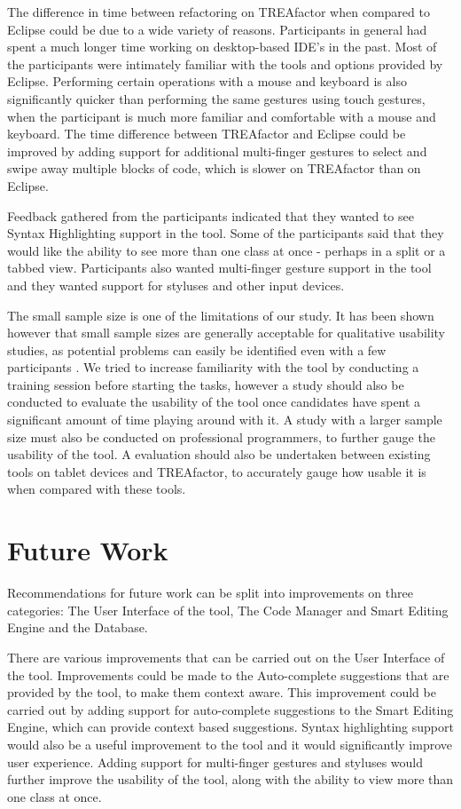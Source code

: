 \documentclass[10.5pt,twocolumn]{article}
\begin{document}
The difference in time between refactoring on TREAfactor when compared to Eclipse could be due to a wide variety of reasons. Participants in general had spent a much longer time working on desktop-based IDE’s in the past. Most of the participants were intimately familiar with the tools and options provided by Eclipse. Performing certain operations with a mouse and keyboard is also significantly quicker than performing the same gestures using touch gestures, when the participant is much more familiar and comfortable with a mouse and keyboard. The time difference between TREAfactor and Eclipse could be improved by adding support for additional multi-finger gestures to select and swipe away multiple blocks of code, which is slower on TREAfactor than on Eclipse.

Feedback gathered from the participants indicated that they wanted to see Syntax Highlighting support in the tool. Some of the participants said that they would like the ability to see more than one class at once - perhaps in a split or a tabbed view. Participants also wanted multi-finger gesture support in the tool and they wanted support for styluses and other input devices.

The small sample size is one of the limitations of our study. It has been shown however that small sample sizes are generally acceptable for qualitative usability studies, as potential problems can easily be identified even with a few participants \cite{faulkner}. We tried to increase familiarity with the tool by conducting a training session before starting the tasks, however a study should also be conducted to evaluate the usability of the tool once candidates have spent a significant amount of time playing around with it. A study with a larger sample size must also be conducted on professional programmers, to further gauge the usability of the tool. A evaluation should also be undertaken between existing tools on tablet devices and TREAfactor, to accurately gauge how usable it is when compared with these tools.

\section{Future Work}
Recommendations for future work can be split into improvements on three categories: The User Interface of the tool, The Code Manager and Smart Editing Engine and the Database.

There are various improvements that can be carried out on the User Interface of the tool. Improvements could be made to the Auto-complete suggestions that are provided by the tool, to make them context aware. This improvement could be carried out by adding support for auto-complete suggestions to the Smart Editing Engine, which can provide context based suggestions. Syntax highlighting support would also be a useful improvement to the tool and it would significantly improve user experience. Adding support for multi-finger gestures and styluses would further improve the usability of the tool, along with the ability to view more than one class at once.
\end{document}
